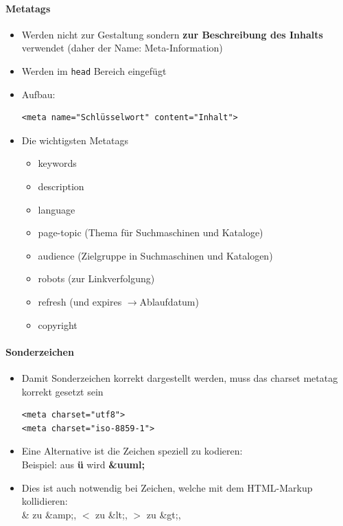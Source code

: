 \paragraph{Metatags}
\begin{itemize}[noitemsep,topsep=0pt,leftmargin=*]
    \item Werden nicht zur Gestaltung sondern \textbf{zur Beschreibung des Inhalts} verwendet (daher der Name: Meta-Information)
    \item Werden im \texttt{head} Bereich eingefügt
    \item Aufbau:
    \begin{lstlisting}
<meta name="Schlüsselwort" content="Inhalt">
    \end{lstlisting}
    \item Die wichtigsten Metatags
    \begin{itemize}[noitemsep,topsep=0pt,leftmargin=*]
        \item keywords
        \item description
        \item language
        \item page-topic (Thema für Suchmaschinen und Kataloge)
        \item audience (Zielgruppe in Suchmaschinen und Katalogen)
        \item robots (zur Linkverfolgung)
        \item refresh (und expires $\rightarrow$Ablaufdatum)
        \item copyright
    \end{itemize}
\end{itemize}

\paragraph{Sonderzeichen}
\begin{itemize}[noitemsep,topsep=0pt,leftmargin=*]
    \item Damit Sonderzeichen korrekt dargestellt werden, muss das charset metatag korrekt gesetzt sein
    \begin{lstlisting}
<meta charset="utf8">
<meta charset="iso-8859-1">
    \end{lstlisting}
    \item Eine Alternative ist die Zeichen speziell zu kodieren:\\
    Beispiel: aus \textbf{ü} wird \textbf{\&uuml;}
    \item Dies ist auch notwendig bei Zeichen, welche mit dem HTML-Markup kollidieren:\\
    \& zu \&amp;, $<$ zu \&lt;, $>$ zu \&gt;, %
\end{itemize}

